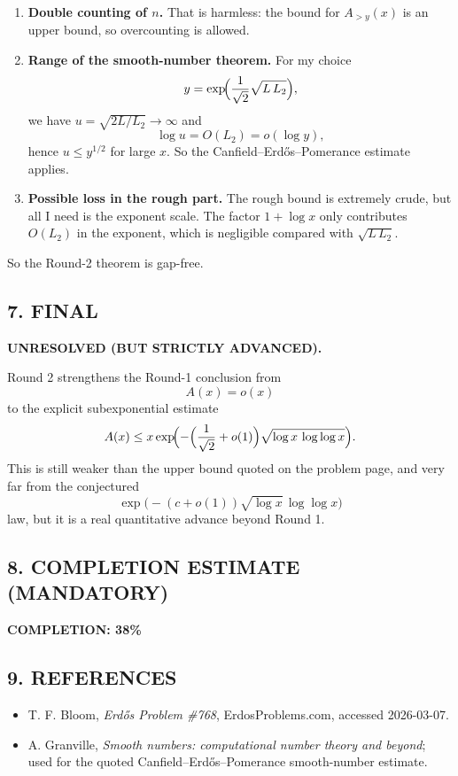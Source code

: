 \begin{enumerate}
\item \textbf{Double counting of $n$.}  
That is harmless: the bound for $A_{>y}(x)$ is an upper bound, so overcounting is allowed.

\item \textbf{Range of the smooth-number theorem.}  
For my choice
\[
y=\exp\!\Bigl(\frac{1}{\sqrt 2}\sqrt{L\,L_2}\Bigr),
\]
we have $u=\sqrt{2L/L_2}\to\infty$ and
\[
\log u=O(L_2)=o(\log y),
\]
hence $u\le y^{1/2}$ for large $x$.
So the Canfield--Erd\H{o}s--Pomerance estimate applies.

\item \textbf{Possible loss in the rough part.}  
The rough bound is extremely crude, but all I need is the exponent scale.
The factor $1+\log x$ only contributes $O(L_2)$ in the exponent, which is negligible compared with $\sqrt{L\,L_2}$.
\end{enumerate}

So the Round-2 theorem is gap-free.

\subsection*{7. FINAL}

\textbf{UNRESOLVED (BUT STRICTLY ADVANCED).}

Round 2 strengthens the Round-1 conclusion from
\[
A(x)=o(x)
\]
to the explicit subexponential estimate
\[
A(x)\le x\exp\!\Bigl(-\Bigl(\frac{1}{\sqrt 2}+o(1)\Bigr)\sqrt{\log x\,\log\log x}\Bigr).
\]
This is still weaker than the upper bound quoted on the problem page, and very far from the conjectured
\[
\exp\!\bigl(-(c+o(1))\sqrt{\log x}\,\log\log x\bigr)
\]
law, but it is a real quantitative advance beyond Round 1.

\subsection*{8. COMPLETION ESTIMATE (MANDATORY)}

\textbf{COMPLETION: 38\%}

\subsection*{9. REFERENCES}

\begin{itemize}
\item T. F. Bloom, \emph{Erd\H{o}s Problem \#768}, ErdosProblems.com, accessed 2026-03-07.
\item A. Granville, \emph{Smooth numbers: computational number theory and beyond}; used for the quoted Canfield--Erd\H{o}s--Pomerance smooth-number estimate.
\end{itemize}

